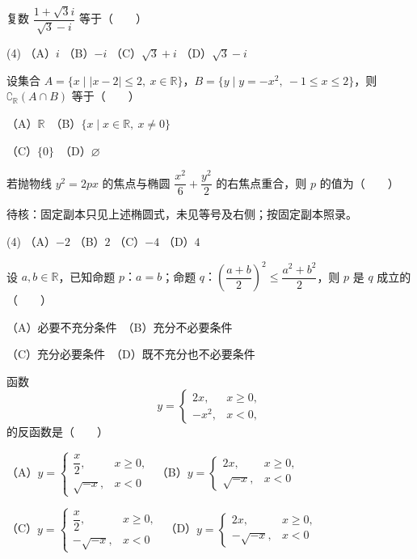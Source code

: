\begin{question}
复数 $\dfrac{1+\sqrt{3}i}{\sqrt{3}-i}$ 等于\mbox{（　　）}

\begin{gkopts}(4)
\task （A）$i$
\task （B）$-i$
\task （C）$\sqrt{3}+i$
\task （D）$\sqrt{3}-i$
\end{gkopts}

\end{question}
\begin{question}
设集合 $A=\{x\mid |x-2|\leqslant 2,\ x\in\mathbb R\}$，$B=\{y\mid y=-x^2,\ -1\leqslant x\leqslant 2\}$，则 $\complement_{\mathbb R}(A\cap B)$ 等于\mbox{（　　）}

（A）$\mathbb R$　（B）$\{x\mid x\in\mathbb R,\ x\ne0\}$

（C）$\{0\}$　（D）$\varnothing$

\end{question}
\begin{question}
若抛物线 $y^2=2px$ 的焦点与椭圆 $\dfrac{x^2}{6}+\dfrac{y^2}{2}$ 的右焦点重合，则 $p$ 的值为\mbox{（　　）}

\begin{gktip}
待核：固定副本只见上述椭圆式，未见等号及右侧；按固定副本照录。
\end{gktip}

\begin{gkopts}(4)
\task （A）$-2$
\task （B）$2$
\task （C）$-4$
\task （D）$4$
\end{gkopts}

\end{question}
\begin{question}
设 $a,b\in\mathbb R$，已知命题 $p\text{：}a=b$；命题 $q\text{：}\left(\dfrac{a+b}{2}\right)^2\leqslant\dfrac{a^2+b^2}{2}$，则 $p$ 是 $q$ 成立的\mbox{（　　）}

（A）必要不充分条件　（B）充分不必要条件

（C）充分必要条件　（D）既不充分也不必要条件

\end{question}
\begin{question}
函数
\nopagebreak[4]
\[
y=\begin{cases}
2x,&x\geqslant0,\\
-x^2,&x<0,
\end{cases}
\]
的反函数是\mbox{（　　）}

（A）$y=\begin{cases}\dfrac{x}{2},&x\geqslant0,\\\sqrt{-x},&x<0\end{cases}$　（B）$y=\begin{cases}2x,&x\geqslant0,\\\sqrt{-x},&x<0\end{cases}$

（C）$y=\begin{cases}\dfrac{x}{2},&x\geqslant0,\\-\sqrt{-x},&x<0\end{cases}$　（D）$y=\begin{cases}2x,&x\geqslant0,\\-\sqrt{-x},&x<0\end{cases}$

\Needspace{0.4\textheight}
\end{question}
